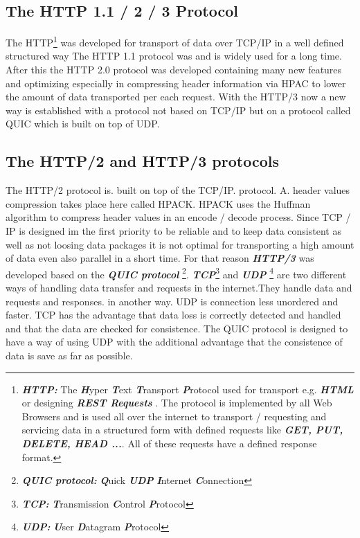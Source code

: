 \documentclass[10pt,a4paper,english]{article}
\newcommand{\abbrhighcol}[1]{\textbf{\textit{#1}}}
\begin{document}
\begin{multicols}{2}
\subsection{The HTTP 1.1 / 2 / 3 Protocol}   
\begin{flushleft}
The HTTP\footnote{\abbrhighcol{HTTP:}  The \abbrhighcol{H}yper \abbrhighcol{T}ext \abbrhighcol {T}ransport \abbrhighcol {P}rotocol used for transport  e.g. \abbrhighcol{HTML} or designing  \abbrhighcol{REST Requests} . The protocol is implemented by all Web Browsers and is used all over the internet to transport / requesting and servicing data in a structured form with defined requests like \abbrhighcol{GET, PUT, DELETE, HEAD ...}. All of these requests have a defined response format.} was developed for transport of data over TCP/IP in a well defined structured way  
The HTTP 1.1 protocol was and is widely used for a long time.
After this the HTTP 2.0 protocol was developed containing many new features and optimizing especially in compressing header information via HPAC to lower the amount of data transported per each request.
With the HTTP/3 now a new way is established with a protocol not based on TCP/IP but on a protocol called QUIC which is built on top of UDP.
\end{flushleft}
\subsection{The HTTP/2 and HTTP/3 protocols}
\begin{flushleft}
The HTTP/2 protocol is. built on top of the TCP/IP. protocol. A. header values compression takes place here called HPACK. HPACK uses the Huffman algorithm to compress header values in an encode / decode process. Since TCP / IP is designed im the first priority to be reliable and to keep data consistent as well as not loosing data packages it is not optimal for transporting a high amount of data even also parallel in a short time. For that reason \abbrhighcol{HTTP/3} was developed based on the \abbrhighcol {QUIC protocol} \footnote{\abbrhighcol {QUIC protocol:} \abbrhighcol{Q}uick \abbrhighcol {UDP} \abbrhighcol{I}nternet \abbrhighcol{C}onnection}.
\abbrhighcol {TCP}\footnote{\abbrhighcol {TCP:} \abbrhighcol {T}ransmission \abbrhighcol {C}ontrol \abbrhighcol {P}rotocol} and \abbrhighcol {UDP} \footnote{\abbrhighcol{UDP: }\abbrhighcol{U}ser \abbrhighcol{D}atagram \abbrhighcol{P}rotocol} are two different ways of handling data transfer and requests in the internet.They handle data and requests and responses. in another way. UDP is connection less unordered and faster. TCP has the advantage that data loss is correctly detected and handled and that the data are checked for consistence. The QUIC protocol is designed to have a way of using UDP with the additional advantage that the consistence of data is save as far as possible.  
\end{flushleft}
\end{multicols}
\end{document}
